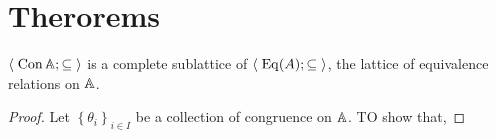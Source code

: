 \documentclass[../main-sheet.tex]{subfiles}
\begin{document}
\chapter{Therorems}
\begin{thm}
    \(\langle\;{\operatorname{Con} \mathbb{A}; \subseteq}\;\rangle\) is a complete sublattice of \(\langle\;{\operatorname{Eq}(A);\subseteq}\;\rangle\), the lattice of equivalence relations on \(\mathbb{A}\).
\end{thm}
\begin{proof}
    Let \(\left\{ \theta_i  \right\}_{i\in I }\) be a collection of congruence on \(\mathbb{A} \). TO show that,
\end{proof}
\end{document}
